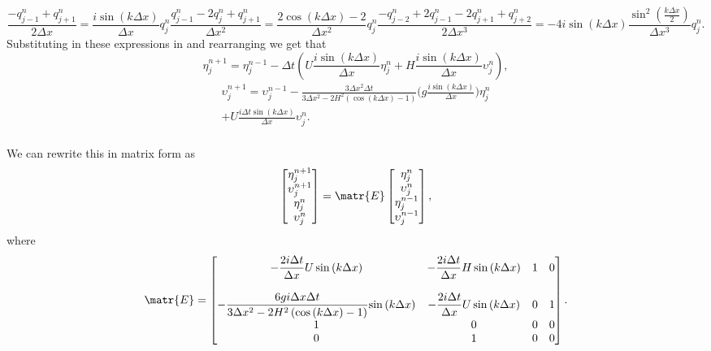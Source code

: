 \begin{subequations}
	\begin{equation}
	 \frac{- q^n_{j-1} + q^n_{j+1}}{2 \Delta x} = \frac{i \sin\left(k \Delta x\right)}{\Delta x} q^n_j
	\end{equation}
	
	\begin{equation}
	\frac{q^n_{j-1} - 2q^n_j + q^n_{j+1}}{\Delta x^2} = \frac{2 \cos\left(k \Delta x\right) - 2}{\Delta x^2} q^n_j 
	\end{equation}
	\begin{equation}
	\frac{- q^n_{j-2}  + 2q^n_{j-1}  - 2q^n_{j+1} + q^n_{j+2}}{2\Delta x^3}=-4i\sin\left(k \Delta x\right)\frac{\sin^2\left(\frac{k \Delta x}{2}\right) }{\Delta x^3} q^n_j.
	\end{equation}
	\label{eqn:FDfactorlist}
\end{subequations}
Substituting in these expressions in and rearranging we get that
\begin{equation*}
\eta^{n+1}_j = \eta^{n-1}_j - \Delta t \left(U  \frac{i \sin\left(k \Delta x\right)}{\Delta x}\eta^n_j + H\frac{i \sin\left(k \Delta x\right)}{\Delta x} \upsilon^n_j \right), 
\end{equation*}
\begin{multline*}
\upsilon^{n+1}_j  =  \upsilon^{n-1}_j  -  \frac{3 \Delta x^2\Delta t}{3 \Delta x^2 -2{H^2} \left( \cos\left(k \Delta x\right) - 1 \right)}\bigg( g \frac{i \sin\left(k \Delta x\right)}{\Delta x}     \bigg) \eta^n_j\\ + U\frac{i \Delta t \sin\left(k \Delta x\right)}{\Delta x} \upsilon^n_j.  \\
\end{multline*}
 
We can rewrite this in matrix form as
\begin{equation}
\begin{bmatrix}
\eta^{n+1}_j \\
\upsilon^{n+1}_j\\
\eta^{n}_j \\
\upsilon^{n}_j
\end{bmatrix} = \matr{E}
\begin{bmatrix}
\eta^{n}_j \\
\upsilon^{n}_j\\
\eta^{n-1}_j \\
\upsilon^{n-1}_j
\end{bmatrix},
\end{equation}
where 
\begin{equation*}
\matr{E} = \begin{bmatrix}
-  \dfrac{2 i\Delta t }{\Delta x} U\sin\left(k \Delta x\right)  & -  \dfrac{2 i\Delta t}{\Delta x} H \sin\left(k \Delta x\right)  & 1 &0 \\ \\
-\dfrac{6 gi \Delta x\Delta t}{3 \Delta x^2 -2{H^2} \left( \cos\left(k \Delta x\right) - 1 \right)}{ \sin\left(k \Delta x\right)}  & -\dfrac{2i \Delta t }{\Delta x} U \sin\left(k \Delta x\right)  & 0 &1 \\
1  & 0  &0 &0 \\
0  & 1  &0 &0 
\end{bmatrix} .
\end{equation*}

